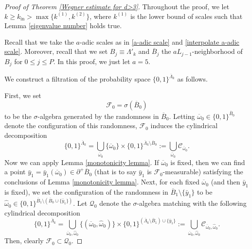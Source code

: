 \documentclass[11pt,reqno,UTF8,twoside]{amsart}
\newcommand{\barLambda}{\overline{\Lambda}}
\newcommand{\baromega}{\overline{\omega}}
\newcommand{\hatomega}{\widehat{\omega}}
\newcommand{\mcC}{\mathcal{C}}
\newcommand{\mcF}{\mathcal{F}}
\newcommand{\mcQ}{\mathcal{Q}}
\newcommand{\barB}{\overline{B}}
\theoremstyle{definition}
\numberwithin{equation}{section}
\begin{document}
\begin{proof}[Proof of Theorem \ref{Wegner estimate for d>3}]

Throughout the proof, we let $k\geq k_{\text{in}}>\max \{k^{(1)}, k^{(2)} \}$, where $k^{(1)}$ is the lower bound of scales such that Lemma \ref{eigenvalue number} holds true. 

Recall that we take the $a$-adic scales  as in  \eqref{a-adic scale} and \eqref{interpolate a-adic scale}. Moreover, recall that we set $B_j\equiv \Lambda'_k$ and $\barB_j$ the $aL_{j-1}$-neighborhood of $B_j$ for $0\leq j\leq P$. In this proof, we just let $a=5$. 

We construct a filtration of the probability space $\{0,1\}^{\barLambda_k}$ as follows. 


First, we set 
\begin{equation}\label{mcF0}
  \mcF_0= \sigma(\barB_0)
\end{equation}
to be the $\sigma$-algebra generated by the randomness in $\barB_0$. Letting $\baromega_0\in \{0,1\}^{\barB_0}$ denote the configuration of this randomness, $\mcF_0$ induces the cylindrical decomposition
\[\{0,1\}^{\barLambda_k}=\bigcup_{\baromega_0} \{\baromega_0\}\times \{0,1\}^{\barLambda_k\setminus \barB_0 }:= \bigcup_{\baromega_0} \mcC_{\baromega_0}.\]
Now we can apply Lemma \ref{monotonicity lemma}. If $\baromega_0$ is fixed, then we can find a point $\bar{y}_1 =\bar{y}_1(\baromega_0)\in \partial^+\barB_0$ (that is to say $\bar{y}_1$ is $\mcF_0$-measurable) satisfying the conclusions of Lemma \ref{monotonicity lemma}. 
Next,  for each fixed $\baromega_0$ (and then $\bar{y}_1$ is fixed), we set the configuration of the randomness in $\barB_1\setminus \{\bar{y}_1\}$ to be $\hatomega_0 \in \{0,1\}^{\barB_1\setminus (\barB_0\cup \{\bar{y}_1\})}$. Let $\mcQ_0$ denote the $\sigma$-algebra matching with the following cylindrical decomposition 
\[ \{0,1\}^{\barLambda_k}=\bigcup_{\baromega_0,\hatomega_0} \{(\baromega_0,\hatomega_0)\}\times \{0,1\}^{(\barLambda_k\setminus \barB_1)\cup \{\bar{y}_1\} }:= \bigcup_{\baromega_0,\hatomega_0}\mcC_{\baromega_0,\hatomega_0}. \]
Then, clearly $\mcF_0\subset \mcQ_0$.


\end{proof}
\end{document}
